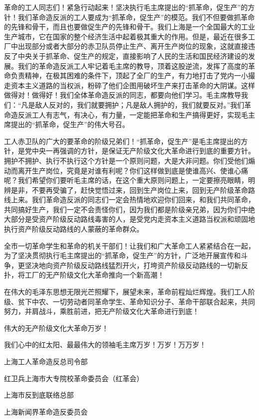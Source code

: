 \begin{maonote}
革命的工人同志们！紧急行动起来！坚决执行毛主席提出的“抓革命，促生产”的方针！我们革命造反派的工人要成为“抓革命，促生产”的模范。我们不但要做抓革命的先锋和骨干，而且也要做促生产的先锋和骨干。我们上海是一个全国最大的工业生产城市，它在国家的整个经济生活中起着极其重大的作用。但是，最近在很多工厂中出现部分或者大部分的赤卫队员停止生产、离开生产岗位的现象，这就直接违反了中央关于抓革命、促生产的规定，直接影响了人民的生活和国民经济建设的发展。我们的革命造反派工人牢记着毛主席的教导，顶着这股逆流，发挥了高度的革命负责精神，在极其困难的条件下，顶起了全厂的生产，有力地打击了党内一小撮走资本主义道路的当权派，粉碎了他们企图用破坏生产来打击革命的大阴谋。这样做得对！做得好！我们全体革命造反派的同志，都要向他们学习。毛主席教导我们：“凡是敌人反对的，我们就要拥护；凡是敌人拥护的，我们就要反对。”我们革命造反派工人有志气，有决心，有力量，一定能把革命和生产搞得更好，实现毛主席提出的“抓革命，促生产”的伟大号召。

工人赤卫队的广大的要革命的阶级兄弟们！“抓革命，促生产”是毛主席提出的方针，是党中央一再强调的方针，是保证无产阶级文化大革命进行到底的重要方针。拥护不拥护、执行不执行这个方针是一个原则问题，大是大非问题。你们受他们煽动而离开生产岗位，究竟是对谁有利呢？你们这样做到底是使谁高兴、使谁心痛呢？我们希望你们要听毛主席的话，在这个重大原则问题上，一定要擦亮眼睛，明辨是非，不要再受骗了，赶快觉悟过来，回到生产岗位上来，回到无产阶级革命路线上来。我们革命造反派的同志们一定会热情地欢迎你们回来，和我们共同革命，共同搞好生产，我们一定不会责怪你们，因为我们都是阶级亲兄弟，因为你们中绝大部分是受资产阶级反动路线毒害的人，是受党内走资本主义道路当权派和顽固地执行资产阶级反动路线的人蒙蔽的革命群众。

全市一切革命学生和革命的机关干部们！让我们和广大革命工人紧紧结合在一起，为了坚决贯彻执行毛主席提出的“抓革命，促生产”的方针，广泛地开展宣传和斗争，更坚决地向资产阶级反动路线猛烈开火，打垮资产阶级反动路线的一切新反扑，将工厂的无产阶级文化大革命推向一个新高潮！

在伟大的毛泽东思想无限光芒照耀下，展望未来，革命前程灿烂辉煌。我们工人阶级、贫下中农、一切劳动者同革命学生、革命知识分子、革命干部联合起来，共同努力，并肩战斗，乘胜前进，把无产阶级文化大革命进行到底！

伟大的无产阶级文化大革命万岁！

我们心中的红太阳、最最伟大的领袖毛主席万岁！万岁！万万岁！

上海工人革命造反总司令部

红卫兵上海市大专院校革命委员会（红革会）

上海市反到底联络总部

上海新闻界革命造反委员会


\end{maonote}
